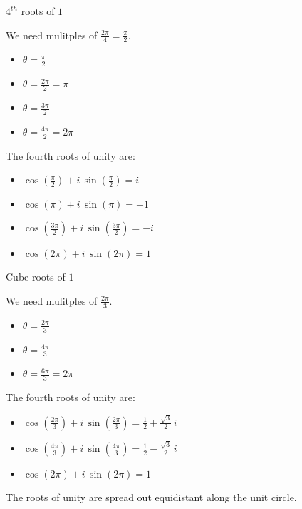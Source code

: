 \documentclass{ximera}
\begin{document}
\begin{example}  $4^{th}$ roots of $1$

We need mulitples of $\frac{2 \pi}{4} = \frac{\pi}{2}$.

\begin{itemize}
\item $\theta = \frac{\pi}{2}$
\item $\theta = \frac{2 \pi}{2} = \pi$
\item $\theta = \frac{3 \pi}{2}$
\item $\theta = \frac{4 \pi}{2} = 2 \pi$
\end{itemize}



The fourth roots of unity are:
\begin{itemize}
\item $\cos\left(\frac{\pi}{2}\right) + i \, \sin\left(\frac{\pi}{2}\right) = i$
\item $\cos(\pi) + i \, \sin(\pi) = -1$
\item $\cos\left(\frac{3 \pi}{2}\right) + i \, \sin\left(\frac{3 \pi}{2}\right) = -i$
\item $\cos(2 \pi) + i \, \sin(2 \pi) = 1$
\end{itemize}






\end{example}















\begin{example}  Cube roots of $1$

We need mulitples of $\frac{2 \pi}{3}$.

\begin{itemize}
\item $\theta = \frac{2 \pi}{3}$
\item $\theta = \frac{4 \pi}{3}$
\item $\theta = \frac{6 \pi}{3} = 2 \pi$
\end{itemize}



The fourth roots of unity are:
\begin{itemize}
\item $\cos\left(\frac{2 \pi}{3}\right) + i \, \sin\left(\frac{2 \pi}{3}\right) = \frac{1}{2} + \frac{\sqrt{3}}{2} \, i$
\item $\cos\left(\frac{4 \pi}{3}\right) + i \, \sin\left(\frac{4 \pi}{3}\right) = \frac{1}{2} - \frac{\sqrt{3}}{2} \, i$
\item $\cos(2 \pi) + i \, \sin(2 \pi) = 1$
\end{itemize}



\end{example}












The roots of unity are spread out equidistant along the unit circle.
\end{document}
